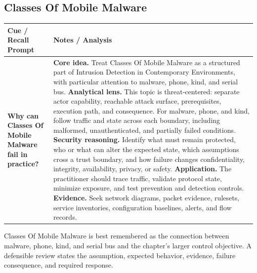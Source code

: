 \documentclass[11pt]{article}
\newcommand{\CornellHeader}{%
\rowcolor{Navy}\color{white}\bfseries Cue / Recall Prompt & \color{white}\bfseries Notes / Analysis\\\hline}
\newcommand{\CornellRow}[2]{%
\cellcolor{CueGray}\RaggedRight\textbf{#1} & \RaggedRight #2\\\hline}
\begin{document}
\subsection*{Classes Of Mobile Malware}
\begin{longtable}{>{\RaggedRight\arraybackslash}p{}|>{\RaggedRight\arraybackslash}p{}}
\CornellHeader
\CornellRow{Why can Classes Of Mobile Malware fail in practice?}{\textbf{Core idea.} Treat Classes Of Mobile Malware as a structured part of Intrusion Detection in Contemporary Environments, with particular attention to malware, phone, kind, and serial bus. \textbf{Analytical lens.} This topic is threat-centered: separate actor capability, reachable attack surface, prerequisites, execution path, and consequence. For malware, phone, and kind, follow traffic and state across each boundary, including malformed, unauthenticated, and partially failed conditions. \textbf{Security reasoning.} Identify what must remain protected, who or what can alter the expected state, which assumptions cross a trust boundary, and how failure changes confidentiality, integrity, availability, privacy, or safety. \textbf{Application.} The practitioner should trace traffic, validate protocol state, minimize exposure, and test prevention and detection controls. \textbf{Evidence.} Seek network diagrams, packet evidence, rulesets, service inventories, configuration baselines, alerts, and flow records.}
\end{longtable}
\begin{topicsummary}
Classes Of Mobile Malware is best remembered as the connection between malware, phone, kind, and serial bus and the chapter's larger control objective. A defensible review states the assumption, expected behavior, evidence, failure consequence, and required response.
\end{topicsummary}
\end{document}

